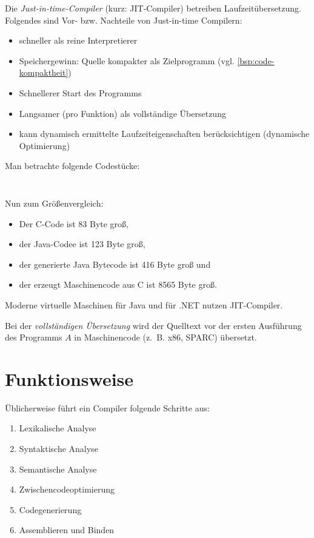 
Die \textit{Just-in-time-Compiler} (kurz: JIT-Compiler) betreiben
Laufzeitübersetzung. Folgendes sind Vor- bzw. Nachteile von Just-in-time Compilern:
\begin{itemize}
	\item schneller als reine Interpretierer
	\item Speichergewinn: Quelle kompakter als Zielprogramm (vgl. \cref{bsp:code-kompaktheit})
	\item Schnellerer Start des Programms
	\item Langsamer (pro Funktion) als vollständige Übersetzung
	\item kann dynamisch ermittelte Laufzeiteigenschaften berücksichtigen (dynamische Optimierung)
\end{itemize}

\begin{beispiel}\label{bsp:code-kompaktheit}%
    Man betrachte folgende Codestücke:

    \inputminted[linenos, numbersep=5pt, tabsize=4, frame=lines, label=Hello.java]{java}{scripts/java/Hello.java}
    \inputminted[linenos, numbersep=5pt, tabsize=4, frame=lines, label=hello-world.c]{c}{scripts/c/hello-world.c}

    Nun zum Größenvergleich:

    \begin{itemize}
        \item Der C-Code ist 83 Byte groß,
        \item der Java-Codee ist 123 Byte groß,
        \item der generierte Java Bytecode ist 416 Byte groß und
        \item der erzeugt Maschinencode aus C ist 8565 Byte groß.
    \end{itemize}
\end{beispiel}

Moderne virtuelle Maschinen für Java und für .NET nutzen JIT-Compiler.

Bei der \textit{vollständigen Übersetzung} wird der Quelltext vor der ersten
Ausführung des Programms $A$ in Maschinencode (z.~B. x86, SPARC) übersetzt.


\section{Funktionsweise}
Üblicherweise führt ein Compiler folgende Schritte aus:
\begin{enumerate}
	\item Lexikalische Analyse
	\item Syntaktische Analyse
	\item Semantische Analyse
	\item Zwischencodeoptimierung
	\item Codegenerierung
    \item Assemblieren und Binden
\end{enumerate}

